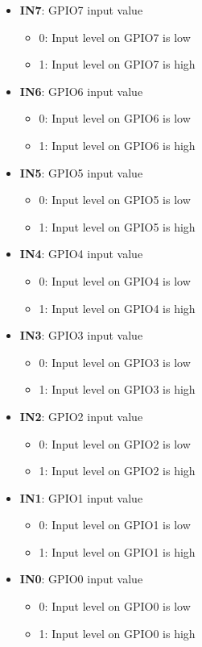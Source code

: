 \documentclass{article}
\begin{document}
		\begin{itemize}
			\item \textbf{IN7}: GPIO7 input value
			\begin{itemize}
				\item 0: Input level on GPIO7 is low
				\item 1: Input level on GPIO7 is high
			\end{itemize}
			\item \textbf{IN6}: GPIO6 input value
			\begin{itemize}
				\item 0: Input level on GPIO6 is low
				\item 1: Input level on GPIO6 is high
			\end{itemize}
			\item \textbf{IN5}: GPIO5 input value
			\begin{itemize}
				\item 0: Input level on GPIO5 is low
				\item 1: Input level on GPIO5 is high
			\end{itemize}
			\item \textbf{IN4}: GPIO4 input value
			\begin{itemize}
				\item 0: Input level on GPIO4 is low
				\item 1: Input level on GPIO4 is high
			\end{itemize}
			\item \textbf{IN3}: GPIO3 input value
			\begin{itemize}
				\item 0: Input level on GPIO3 is low
				\item 1: Input level on GPIO3 is high
			\end{itemize}
			\item \textbf{IN2}: GPIO2 input value
			\begin{itemize}
				\item 0: Input level on GPIO2 is low
				\item 1: Input level on GPIO2 is high
			\end{itemize}
			\item \textbf{IN1}: GPIO1 input value
			\begin{itemize}
				\item 0: Input level on GPIO1 is low
				\item 1: Input level on GPIO1 is high
			\end{itemize}
			\item \textbf{IN0}: GPIO0 input value
			\begin{itemize}
				\item 0: Input level on GPIO0 is low
				\item 1: Input level on GPIO0 is high
			\end{itemize}
		\end{itemize}
		
\end{document}
